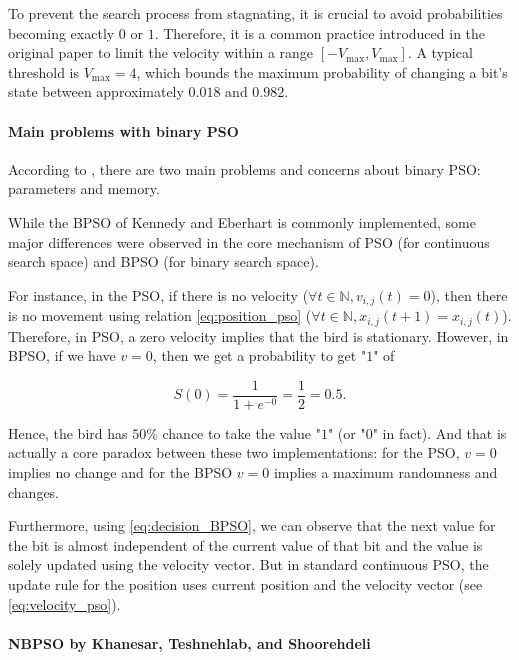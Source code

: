 \documentclass[12pt, openany]{article}
\begin{document}
To prevent the search process from stagnating, it is crucial to avoid probabilities becoming exactly $0$ or $1$. Therefore, it is a common practice introduced in the original paper to limit the velocity within a range $[-V_{\max}, V_{\max}]$. A typical threshold is $V_{\max} = 4$, which bounds the maximum probability of changing a bit's state between approximately $0.018$ and $0.982$.

\paragraph{Main problems with binary PSO}

According to \cite{4433821}, there are two main problems and concerns about binary
PSO: parameters and memory.

While the BPSO of Kennedy and Eberhart is commonly implemented, some major differences were observed in the core mechanism of PSO (for continuous search space) and BPSO (for binary search space).

For instance, in the PSO, if there is no velocity ($\forall t \in \mathbb{N}, v_{i,j}(t)=0$), then there is no movement using relation \eqref{eq:position_pso} ($\forall t \in \mathbb{N}, x_{i,j}(t+1)=x_{i,j}(t)$). Therefore, in PSO, a zero velocity implies that the bird is stationary. However, in BPSO, if we have $v=0$, then we get a probability to get "$1$" of

\begin{equation*}
    S(0)=\frac{1}{1+e^{-0}} = \frac{1}{2} = 0.5.
\end{equation*}

Hence, the bird has $50\%$ chance to take the value "$1$" (or "$0$" in fact). And that is actually a core paradox between these two implementations: for the PSO, $v=0$ implies no change and for the BPSO $v=0$ implies a maximum randomness and changes.

Furthermore, using \eqref{eq:decision_BPSO}, we can observe that the next value for the bit is
almost independent of the current value of that bit and the value is solely updated using the velocity vector. But in standard continuous PSO, the update rule for the position uses current position and the velocity vector (see \eqref{eq:velocity_pso}).

\paragraph{NBPSO by Khanesar, Teshnehlab, and Shoorehdeli}
\end{document}
